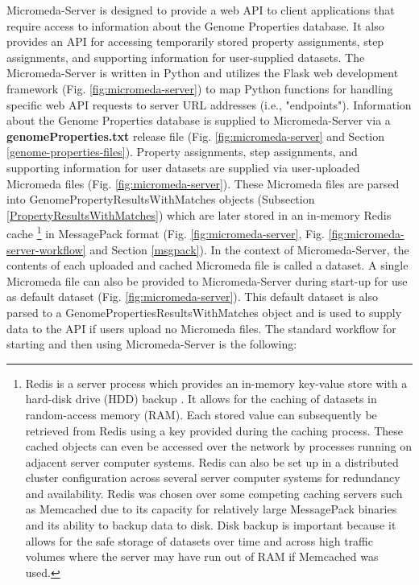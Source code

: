 Micromeda-Server is designed to provide a web API to client applications that require access to information about the Genome Properties database. It also provides an API for accessing temporarily stored property assignments, step assignments, and supporting information for user-supplied datasets. The Micromeda-Server is written in Python and utilizes the Flask web development framework \cite{grinberg2018flask} (Fig. \ref{fig:micromeda-server}) to map Python functions for handling specific web API requests to server URL addresses (i.e., "endpoints"). Information about the Genome Properties database is supplied to Micromeda-Server via a \textbf{genomeProperties.txt} release file (Fig. \ref{fig:micromeda-server} and Section \ref{genome-properties-files}). Property assignments, step assignments, and supporting information for user datasets are supplied via user-uploaded Micromeda files (Fig. \ref{fig:micromeda-server}). These Micromeda files are parsed into GenomePropertyResultsWithMatches objects (Subsection \ref{PropertyResultsWithMatches}) which are later stored in an in-memory Redis cache \footnote{Redis is a server process which provides an in-memory key-value store with a hard-disk drive (HDD) backup \cite{han2011survey}. It allows for the caching of datasets in random-access memory (RAM). Each stored value can subsequently be retrieved from Redis using a key provided during the caching process. These cached objects can even be accessed over the network by processes running on adjacent server computer systems. Redis can also be set up in a distributed cluster configuration across several server computer systems for redundancy and availability. Redis was chosen over some competing caching servers such as Memcached \cite{fitzpatrick2004distributed} due to its capacity for relatively large MessagePack binaries \cite{furuhashi2013messagepack} and its ability to backup data to disk. Disk backup is important because it allows for the safe storage of datasets over time and across high traffic volumes where the server may have run out of RAM if Memcached was used.} in MessagePack format \cite{furuhashi2013messagepack} (Fig. \ref{fig:micromeda-server}, Fig. \ref{fig:micromeda-server-workflow} and Section \ref{msgpack}). In the context of Micromeda-Server, the contents of each uploaded and cached Micromeda file is called a dataset. A single Micromeda file can also be provided to Micromeda-Server during start-up for use as default dataset (Fig. \ref{fig:micromeda-server}). This default dataset is also parsed to a GenomePropertiesResultsWithMatches object and is used to supply data to the API if users upload no Micromeda files. The standard workflow for starting and then using Micromeda-Server is the following:

